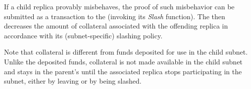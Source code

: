 

If a child replica provably misbehaves, the proof of such misbehavior can be submitted as a transaction to the \sa (invoking its \emph{Slash} function).
The \sa then decreases the amount of collateral associated with the offending replica in accordance with its (subnet-specific) slashing policy.

Note that collateral is different from funds deposited for use in the child subnet.
Unlike the deposited funds, collateral is not made available in the child subnet
and stays in the parent's \sa until the associated replica stops participating in the subnet, either by leaving or by being slashed.




